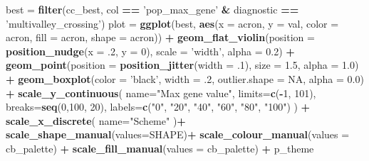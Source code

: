 \documentclass[]{book}
\newenvironment{Shaded}{\begin{snugshade}}{\end{snugshade}}
\newcommand{\DataTypeTok}[1]{\textcolor[rgb]{0.13,0.29,0.53}{#1}}
\newcommand{\DecValTok}[1]{\textcolor[rgb]{0.00,0.00,0.81}{#1}}
\newcommand{\FloatTok}[1]{\textcolor[rgb]{0.00,0.00,0.81}{#1}}
\newcommand{\KeywordTok}[1]{\textcolor[rgb]{0.13,0.29,0.53}{\textbf{#1}}}
\newcommand{\NormalTok}[1]{#1}
\newcommand{\OperatorTok}[1]{\textcolor[rgb]{0.81,0.36,0.00}{\textbf{#1}}}
\newcommand{\OtherTok}[1]{\textcolor[rgb]{0.56,0.35,0.01}{#1}}
\newcommand{\StringTok}[1]{\textcolor[rgb]{0.31,0.60,0.02}{#1}}
\begin{document}
\begin{Shaded}
\begin{Highlighting}[]
\NormalTok{best =}\StringTok{ }\KeywordTok{filter}\NormalTok{(cc_best, col }\OperatorTok{==}\StringTok{ 'pop_max_gene'} \OperatorTok{&}\StringTok{ }\NormalTok{diagnostic }\OperatorTok{==}\StringTok{ 'multivalley_crossing'}\NormalTok{)}
\NormalTok{plot =}\StringTok{ }\KeywordTok{ggplot}\NormalTok{(best, }\KeywordTok{aes}\NormalTok{(}\DataTypeTok{x =}\NormalTok{ acron, }\DataTypeTok{y =}\NormalTok{ val, }\DataTypeTok{color =}\NormalTok{ acron, }\DataTypeTok{fill =}\NormalTok{ acron, }\DataTypeTok{shape =}\NormalTok{ acron)) }\OperatorTok{+}
\StringTok{  }\KeywordTok{geom_flat_violin}\NormalTok{(}\DataTypeTok{position =} \KeywordTok{position_nudge}\NormalTok{(}\DataTypeTok{x =} \FloatTok{.2}\NormalTok{, }\DataTypeTok{y =} \DecValTok{0}\NormalTok{), }\DataTypeTok{scale =} \StringTok{'width'}\NormalTok{, }\DataTypeTok{alpha =} \FloatTok{0.2}\NormalTok{) }\OperatorTok{+}
\StringTok{  }\KeywordTok{geom_point}\NormalTok{(}\DataTypeTok{position =} \KeywordTok{position_jitter}\NormalTok{(}\DataTypeTok{width =} \FloatTok{.1}\NormalTok{), }\DataTypeTok{size =} \FloatTok{1.5}\NormalTok{, }\DataTypeTok{alpha =} \FloatTok{1.0}\NormalTok{) }\OperatorTok{+}
\StringTok{  }\KeywordTok{geom_boxplot}\NormalTok{(}\DataTypeTok{color =} \StringTok{'black'}\NormalTok{, }\DataTypeTok{width =} \FloatTok{.2}\NormalTok{, }\DataTypeTok{outlier.shape =} \OtherTok{NA}\NormalTok{, }\DataTypeTok{alpha =} \FloatTok{0.0}\NormalTok{) }\OperatorTok{+}
\StringTok{  }\KeywordTok{scale_y_continuous}\NormalTok{(}
    \DataTypeTok{name=}\StringTok{"Max gene value"}\NormalTok{,}
    \DataTypeTok{limits=}\KeywordTok{c}\NormalTok{(}\OperatorTok{-}\DecValTok{1}\NormalTok{, }\DecValTok{101}\NormalTok{),}
    \DataTypeTok{breaks=}\KeywordTok{seq}\NormalTok{(}\DecValTok{0}\NormalTok{,}\DecValTok{100}\NormalTok{, }\DecValTok{20}\NormalTok{),}
    \DataTypeTok{labels=}\KeywordTok{c}\NormalTok{(}\StringTok{"0"}\NormalTok{, }\StringTok{"20"}\NormalTok{, }\StringTok{"40"}\NormalTok{, }\StringTok{"60"}\NormalTok{, }\StringTok{"80"}\NormalTok{, }\StringTok{"100"}\NormalTok{)}
\NormalTok{  ) }\OperatorTok{+}
\StringTok{  }\KeywordTok{scale_x_discrete}\NormalTok{(}
    \DataTypeTok{name=}\StringTok{"Scheme"}
\NormalTok{  )}\OperatorTok{+}
\StringTok{  }\KeywordTok{scale_shape_manual}\NormalTok{(}\DataTypeTok{values=}\NormalTok{SHAPE)}\OperatorTok{+}
\StringTok{  }\KeywordTok{scale_colour_manual}\NormalTok{(}\DataTypeTok{values =}\NormalTok{ cb_palette) }\OperatorTok{+}
\StringTok{  }\KeywordTok{scale_fill_manual}\NormalTok{(}\DataTypeTok{values =}\NormalTok{ cb_palette) }\OperatorTok{+}
\StringTok{  }\NormalTok{p_theme}


\end{Highlighting}
\end{Shaded}
\end{document}
